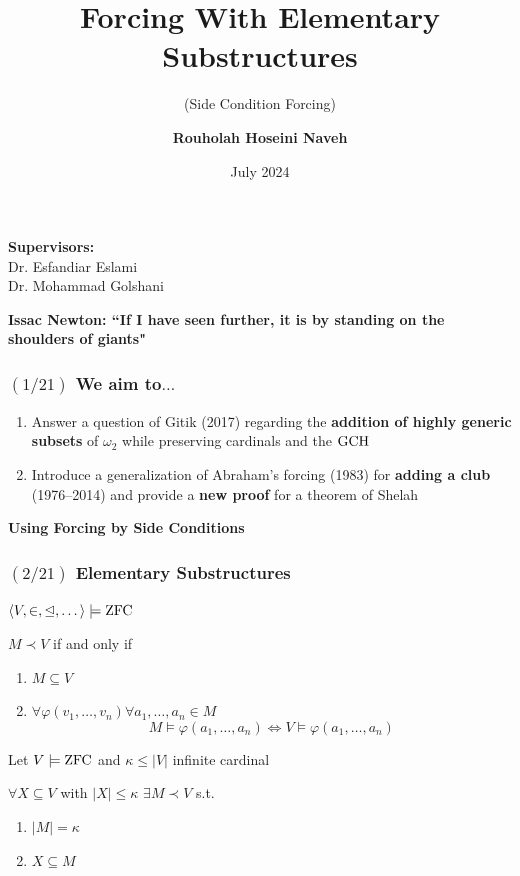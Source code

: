 \documentclass{beamer}
\newcommand{\zfc}{\rm{ZFC}}
\newcommand{\gch}{\rm{GCH}}
\newcommand{\for}[2]{\varphi({#1}_1, \dots, {#1}_{#2})}
\newcommand{\seq}[2]{{#1}_1, \dots, {#1}_{#2}}
\begin{document}
\title{\textbf{Forcing With Elementary Substructures}}
\subtitle{(Side Condition Forcing)}
\author{\textbf{Rouholah Hoseini Naveh}}
\begin{frame}
\date{July 2024}
\maketitle
\begin{center}
\textbf{{\large Supervisors:\\}}
Dr. Esfandiar Eslami\\
Dr. Mohammad Golshani \\
\end{center}
\begin{center}
\textbf{Issac Newton: ``If I have seen further, it is by standing on the shoulders of giants"}
\end{center}
\end{frame}
\begin{frame}
\frametitle{$(1/21)$\hspace{20mm} We aim to$\dots$}
\begin{enumerate}
\item
{\large
Answer a question of Gitik (2017) regarding the \textbf{addition of highly generic subsets} of $\omega_2$ while preserving cardinals and the $\gch$
}
\pause
\vspace{10mm}
\item
{\large
Introduce a generalization of Abraham’s forcing (1983) for \textbf{adding a club} (1976–2014) and provide a \textbf{new proof} for a theorem of Shelah
}
\end{enumerate}
\pause
\begin{center}
{\large \textbf{Using Forcing by Side Conditions}}
\end{center}
\end{frame}
\begin{frame}
\frametitle{$(2/21)$ \hspace{15mm}Elementary Substructures}
\begin{center}
{\Huge $\langle V, \in, \unlhd, \dots \rangle \models \zfc$}
\end{center}
\pause
\begin{definition}
$M \prec V$ if and only if 
\begin{enumerate}
\item
$M \subseteq V$
\item
$\forall \for{v}{n}\forall \seq{a}{n} \in M$
$$M \models \for{a}{n} \iff V \models \for{a}{n}$$
\end{enumerate}
\end{definition}
\pause
\begin{lemma}
Let $V\models \zfc$ and $\kappa \leq |V| $ infinite cardinal

$\forall X \subseteq V$ with $|X| \leq \kappa$ $\exists M\prec V$ s.t. 
\begin{enumerate}
\item
$|M|=\kappa$
\item 
$X \subseteq M$
\end{enumerate}
\end{lemma}
\end{frame}
\end{document}
